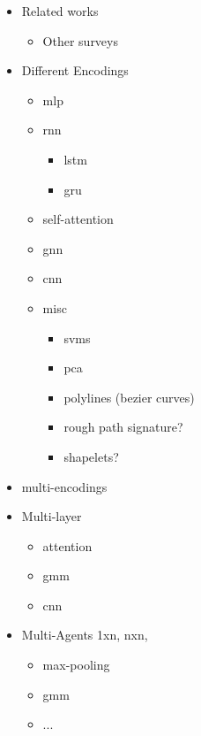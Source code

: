 

\begin{itemize}
    
    \item Related works
    \begin{itemize}
        \item Other surveys 
    \end{itemize}

    \item Different Encodings
    \begin{itemize}
        \item mlp
        \item rnn
        \begin{itemize}
            \item lstm
            \item gru
        \end{itemize}
        \item self-attention
        \item gnn
        \item cnn
        
        \item misc
        \begin{itemize}
            \item svms
            \item pca
            \item polylines (bezier curves)
            \item rough path signature?
            \item shapelets?
        \end{itemize}
    \end{itemize}

    \item multi-encodings 
	\item Multi-layer
	\begin{itemize}
		\item attention
		\item gmm
		\item cnn
	\end{itemize}

	\item Multi-Agents
	1xn, nxn, 
	\begin{itemize}
		\item max-pooling
		\item gmm
		\item ...
	\end{itemize}


\end{itemize}
